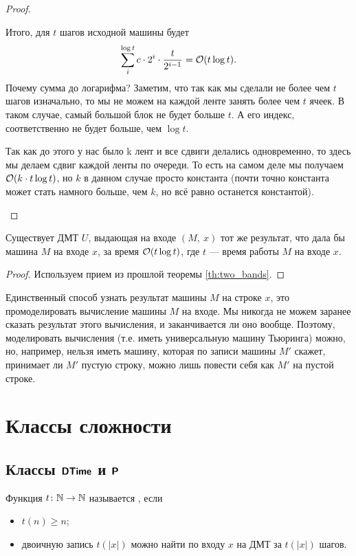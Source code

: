 \begin{proof}
\begin{itemize}
			Итого, для $ t$ шагов исходной машины будет
			\[
				\sum_{i}^{\log t}c\cdot 2^{i} \cdot \frac{t}{2^{i-1}} = \O(t \log t)
			.\]
			Почему сумма до логарифма? Заметим, что так как мы сделали не более чем $ t$ шагов изначально, то мы не можем на каждой ленте занять более чем $ t$ ячеек. В таком случае, самый большой блок не будет больше $ t$. А его индекс, соответственно не будет больше, чем $ \log t$.
			\begin{note}
			Так как до этого у нас было k лент и все сдвиги делались одновременно, то здесь мы делаем сдвиг каждой ленты по очереди. То есть на самом деле мы получаем $ \O(k \cdot t \log t)$, но $ k$ в данном случае просто константа (почти точно константа может стать намного больше, чем $ k$, но всё равно останется константой). 
			\end{note}
	\end{itemize}
\end{proof}

\begin{thm}[Об универсальной МТ]
	Существует ДМТ $ U$, выдающая на входе $(M, ~ x)$ тот же результат, что дала бы машина $ M$ на входе $ x$, за время $ \O(t \log t)$, где $ t $ --- время работы $ M$ на входе $ x$.
\end{thm}
\begin{proof}
	Используем прием из прошлой теоремы \ref{th:two_bands}.
\end{proof}

\begin{note}
	Единственный способ узнать результат машины $M$ на строке $x$, это промоделировать вычисление машины $M$ на входе. Мы никогда не можем заранее сказать результат этого вычисления, и заканчивается ли оно вообще. Поэтому, моделировать вычисления (т.е. иметь универсальную машину Тьюринга) можно, но, например, нельзя иметь машину, которая по записи машины $M'$ скажет, принимает ли $M'$ пустую строку, можно лишь повести себя как $M'$ на пустой строке.
\end{note}

\section{Классы сложности}
\subsection{Классы $\DTIME$ и $\P$}

\begin{defn}
	Функция $ t\colon \N \to  \N$ называется , если
	\begin{itemize}[noitemsep]
		\item $ t(n) \ge n$;
		\item двоичную запись  $ t(\lvert x \rvert )$ можно найти по входу $ x$ на ДМТ за  $ t(\lvert x \rvert )$ шагов.
	\end{itemize}
\end{defn}

